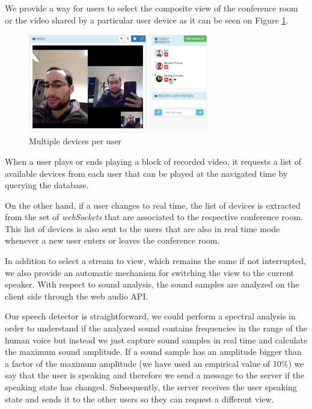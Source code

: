 		We provide a way for users to select the composite view of the conference room or the video shared by a particular user device as it can be seen on Figure \ref{fig:devices}. 
	
	\begin{figure}
		\centering
		\includegraphics[width=0.7\textwidth]{figures/devices.png}
		\caption{Multiple devices per user}
		\label{fig:devices}
	\end{figure}


		When a user plays or ends playing a block of recorded video, it requests a list of available devices from each user that can be played at the navigated time by querying the database.

		On the other hand, if a user changes to real time, the list of devices is extracted from the set of \emph{webSockets} that are associated to the respective conference room. This list of devices is also sent to the users that are also in real time mode whenever a new user enters or leaves the conference room.

		In addition to select a stream to view, which remains the same if not interrupted, we also provide an automatic mechanism for switching the view to the current speaker. With respect to sound analysis, the sound samples are analyzed on the client side through the web audio \ac{API}.

		Our speech detector is straightforward, we could perform a spectral analysis in order to understand if the analyzed sound contains frequencies in the range of the human voice but instead we just capture sound samples in real time and calculate the maximum sound amplitude. If a sound sample has an amplitude bigger than a factor of the maximum amplitude (we have used an empirical value of 10\%) we say that the user is speaking and therefore we send a message to the server if the speaking state has changed. Subsequently, the server receives the user speaking state and sends it to the other users so they can request a different view.

